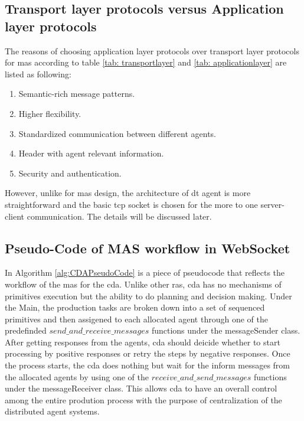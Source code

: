 \subsection{Transport layer protocols versus Application layer protocols}
The reasons of choosing application layer protocols over transport layer protocols for \gls{mas} according to table \ref{tab: transportlayer} and \ref{tab: applicationlayer} are listed as following:
\begin{enumerate}
    \item Semantic-rich message patterns. 
    \item Higher flexibility.
    \item Standardized communication between different agents.
    \item Header with agent relevant information.
    \item Security and authentication.
    \end{enumerate}
However, unlike for \gls{mas} design, the architecture of \gls{dt} agent is more straightforward and the basic \gls{tcp} socket is chosen for the more to one server-client communication. 
The details will be discussed later.

\subsection{Pseudo-Code of MAS workflow in WebSocket}
In Algorithm \ref{alg:CDAPseudoCode} is a piece of pseudocode that reflects the workflow of the \gls{mas} for the \gls{cda}. 
Unlike other \gls{ras}, \gls{cda} has no mechanisms of primitives execution but the ability to do planning and decision making. 
Under the Main, the production tasks are broken down into a set of sequenced primitives and then assigened to each allocated agent through one of the predefinded $send\_and\_receive\_messages$ functions under the messageSender class.
After getting responses from the agents, \gls{cda} should deicide whether to start processing by positive responses or retry the steps by negative responses.  
Once the process starts, the \gls{cda} does nothing but wait for the inform messages from the allocated agents by using one of the $receive\_and\_send\_messages$ functions under the messageReceiver class. 
This allows \gls{cda} to have an overall control among the entire prodution process with the purpose of centralization of the distributed agent systems.  


